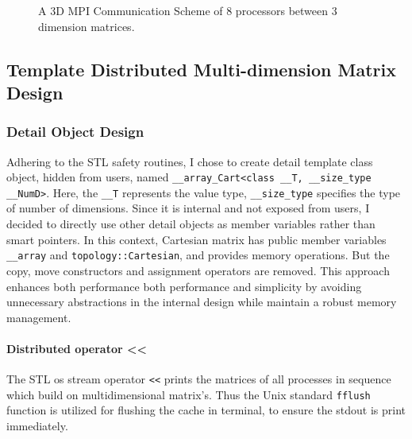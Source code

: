 \begin{figure}[htbp]
  \caption{A 3D MPI Communication Scheme of $8$ processors between $3$ dimension matrices.}
  \label{FIG_MPI_3D_exchange_SCHEME}
\end{figure}


\subsection{Template Distributed Multi-dimension Matrix Design}\label{SEC:SUB:Distributed_Matrix_Design}
\subsubsection{Detail Object Design}
Adhering to the STL safety routines, I chose to create detail template class object, hidden from users,
named \texttt{\_\_array\_Cart<class \_\_T, \_\_size\_type \_\_NumD>}.
Here, the \texttt{\_\_T} represents the value type, \texttt{\_\_size\_type} specifies the type of number of dimensions.
Since it is internal and not exposed from users, I decided to directly use other detail objects as member variables rather than 
smart pointers.
In this context, Cartesian matrix has public member variables \texttt{\_\_array} and \texttt{topology::Cartesian},
and provides memory operations. 
But the copy, move constructors and assignment operators are removed.
This approach enhances both performance both performance and simplicity by avoiding unnecessary abstractions in the internal design 
while maintain a robust memory management.

\paragraph{Distributed operator <<}
The STL os stream operator \texttt{<<} prints the matrices of all processes in sequence which build on multidimensional matrix's. 
Thus the Unix standard \texttt{fflush} function is utilized for flushing the cache in terminal, to ensure the stdout is print immediately.

